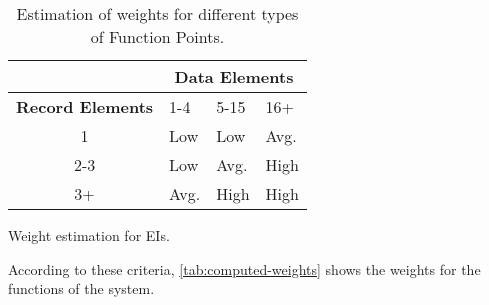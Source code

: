 \begin{table}[h]
\begin{subtable}{\textwidth}
    \centering
    \begin{tabular}{| c | l | l | l |}
        \hline
         & \multicolumn{3}{c|}{\textbf{Data Elements}} \\
        \hline
        \textbf{Record Elements} & 1-4 & 5-15 & 16+ \\
        \hline
        1       & Low     & Low     & Avg.     \\
        2-3     & Low     & Avg.    & High     \\
        3+      & Avg.    & High    & High     \\
        \hline
    \end{tabular}
    \caption{Weight estimation for EIs.}
\end{subtable}
\caption{Estimation of weights for different types of Function Points.}
\label{tab:weight-estimation}
\end{table}

According to these criteria, \autoref{tab:computed-weights} shows the weights for the functions of the system.

